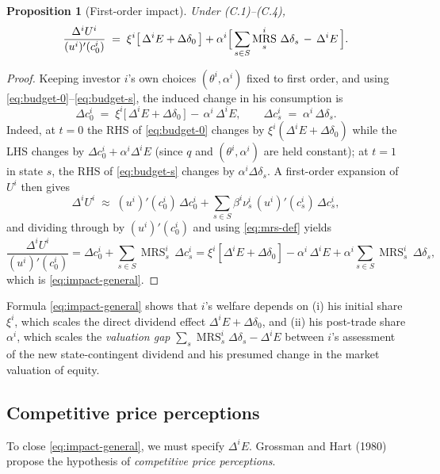 \documentclass[11pt,a4paper]{article}
\DeclareMathOperator{\MRS}{MRS}
\theoremstyle{plain}
\newtheorem{proposition}[theorem]{Proposition}
\theoremstyle{definition}
\theoremstyle{remark}
\begin{document}
\begin{proposition}[First-order impact]\label{prop:impact}
Under \textup{(C.1)--(C.4)},
\begin{equation}\label{eq:impact-general}
  \frac{\Delta^i U^i}{(u^i)'(c^i_0)}
  \;=\;
  \xi^i\bigl[\,\Delta^i E + \Delta\delta_0\,\bigr]
  + \alpha^i\Bigl[\,\sum_{s\in S} \MRS^i_s\,\Delta\delta_s \,-\, \Delta^i E\,\Bigr].
\end{equation}
\end{proposition}

\begin{proof}
Keeping investor $i$'s own choices $(\theta^i,\alpha^i)$ fixed to first order, and using \eqref{eq:budget-0}--\eqref{eq:budget-s}, the induced change in his consumption is
\[
  \Delta c^i_0 \;=\; \xi^i\bigl[\,\Delta^i E + \Delta\delta_0\,\bigr] \,-\, \alpha^i\,\Delta^i E,
  \qquad
  \Delta c^i_s \;=\; \alpha^i\,\Delta\delta_s.
\]
Indeed, at $t=0$ the RHS of \eqref{eq:budget-0} changes by $\xi^i(\Delta^i E + \Delta\delta_0)$ while the LHS changes by $\Delta c^i_0 + \alpha^i\Delta^i E$ (since $q$ and $(\theta^i,\alpha^i)$ are held constant); at $t=1$ in state $s$, the RHS of \eqref{eq:budget-s} changes by $\alpha^i\Delta\delta_s$. A first-order expansion of $U^i$ then gives
\[
  \Delta^i U^i \;\approx\; (u^i)'(c^i_0)\,\Delta c^i_0
  + \sum_{s\in S} \beta^i\nu^i_s\,(u^i)'(c^i_s)\,\Delta c^i_s,
\]
and dividing through by $(u^i)'(c^i_0)$ and using \eqref{eq:mrs-def} yields
\[
  \frac{\Delta^i U^i}{(u^i)'(c^i_0)}
  = \Delta c^i_0 + \sum_{s\in S}\MRS^i_s\,\Delta c^i_s
  = \xi^i[\Delta^i E + \Delta\delta_0] - \alpha^i\,\Delta^i E + \alpha^i\sum_{s\in S}\MRS^i_s\,\Delta\delta_s,
\]
which is \eqref{eq:impact-general}.
\end{proof}

Formula \eqref{eq:impact-general} shows that $i$'s welfare depends on (i) his initial share $\xi^i$, which scales the direct dividend effect $\Delta^i E + \Delta\delta_0$, and (ii) his post-trade share $\alpha^i$, which scales the \emph{valuation gap} $\sum_s\MRS^i_s\Delta\delta_s-\Delta^i E$ between $i$'s assessment of the new state-contingent dividend and his presumed change in the market valuation of equity.

\subsection{Competitive price perceptions}

To close \eqref{eq:impact-general}, we must specify $\Delta^i E$. Grossman and Hart (1980) propose the hypothesis of \emph{competitive price perceptions}.
\end{document}
